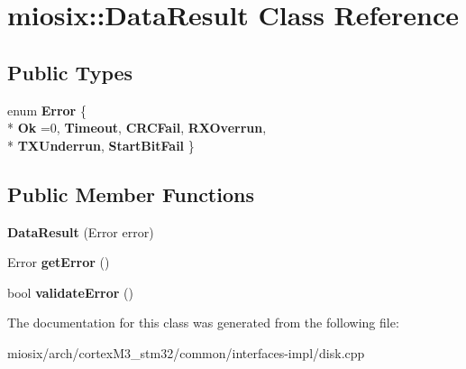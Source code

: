 \hypertarget{classmiosix_1_1_data_result}{\section{miosix\-:\-:Data\-Result Class Reference}
\label{classmiosix_1_1_data_result}
}
\subsection*{Public Types}
\begin{DoxyCompactItemize}
\item 
enum {\bfseries Error} \{ \\*
{\bfseries Ok} =0, 
{\bfseries Timeout}, 
{\bfseries C\-R\-C\-Fail}, 
{\bfseries R\-X\-Overrun}, 
\\*
{\bfseries T\-X\-Underrun}, 
{\bfseries Start\-Bit\-Fail}
 \}
\end{DoxyCompactItemize}
\subsection*{Public Member Functions}
\begin{DoxyCompactItemize}
\item 
\hypertarget{classmiosix_1_1_data_result_a6c93077eaf47f46efb5d443181f60240}{{\bfseries Data\-Result} (Error error)}\label{classmiosix_1_1_data_result_a6c93077eaf47f46efb5d443181f60240}

\item 
\hypertarget{classmiosix_1_1_data_result_a99573511babca5b5d023cd4672529152}{Error {\bfseries get\-Error} ()}\label{classmiosix_1_1_data_result_a99573511babca5b5d023cd4672529152}

\item 
\hypertarget{classmiosix_1_1_data_result_af9fada151122e4bb110b5f77d51b4679}{bool {\bfseries validate\-Error} ()}\label{classmiosix_1_1_data_result_af9fada151122e4bb110b5f77d51b4679}

\end{DoxyCompactItemize}


The documentation for this class was generated from the following file\-:\begin{DoxyCompactItemize}
\item 
miosix/arch/cortex\-M3\-\_\-stm32/common/interfaces-\/impl/disk.\-cpp\end{DoxyCompactItemize}
